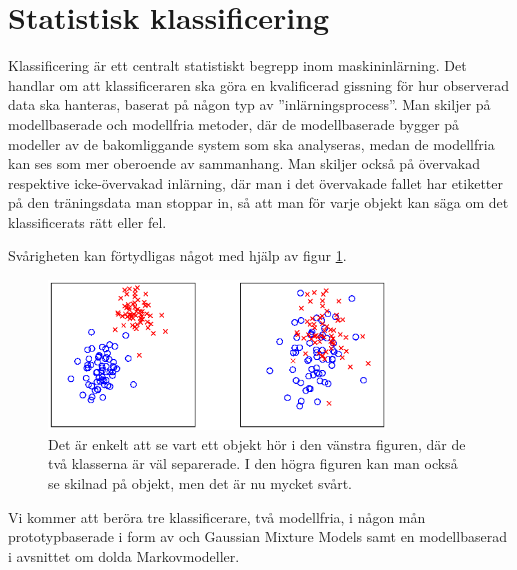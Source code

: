 \documentclass[../rapport_MVEX01-11-05]{subfiles}
\begin{document}
\section{Statistisk klassificering}\label{sec:klassificering}

Klassificering är ett centralt statistiskt begrepp inom maskininlärning.
Det handlar om att klassificeraren ska göra en kvalificerad gissning för hur
observerad data ska hanteras, baserat på någon typ av ''inlärningsprocess''.
Man skiljer på modellbaserade och modellfria metoder, där de modellbaserade
bygger på modeller av de bakomliggande system som ska analyseras, medan de
modellfria kan ses som mer oberoende av sammanhang.
Man skiljer också på övervakad respektive icke-övervakad inlärning,
där man i det övervakade fallet har etiketter på den träningsdata man stoppar
in, så att man för varje objekt kan säga om det klassificerats rätt eller fel.

Svårigheten kan förtydligas något med hjälp av figur \ref{fig:kluster}.
\begin{figure}[!htpb]
    \begin{center}
        \includegraphics[width=0.8\textwidth,clip=true,trim=2cm 3cm 1.5cm 3cm]{bilder/kluster.eps}
    \end{center}
    \caption{Det är enkelt att se vart ett objekt hör i den vänstra figuren,
    där de två klasserna är väl separerade. I den högra figuren kan man också se
    skilnad på objekt, men det är nu mycket svårt.}
    \label{fig:kluster}
\end{figure}

Vi kommer att beröra tre klassificerare, två modellfria, i någon mån
prototypbaserade i form av \knn och Gaussian Mixture Models samt en
modellbaserad i avsnittet om dolda Markovmodeller.

%
\end{document}
